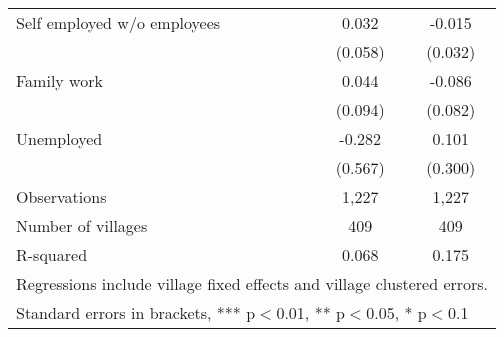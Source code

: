\begin{table}
\begin{tabular}{lcc}
Self employed w/o employees & 0.032 & -0.015 \\
 & (0.058) & (0.032) \\
Family work& 0.044 & -0.086 \\
 & (0.094) & (0.082) \\
Unemployed & -0.282 & 0.101 \\
 & (0.567) & (0.300) \\
Observations & 1,227 & 1,227 \\
Number of villages & 409 & 409 \\
R-squared & 0.068 & 0.175 \\ \hline
\multicolumn{3}{p{11cm}}{Regressions include village fixed effects and village clustered errors.} \\
\multicolumn{3}{l}{ Standard errors in brackets, *** p$<$0.01, ** p$<$0.05, * p$<$0.1} \\
\end{tabular}
\end{table}
